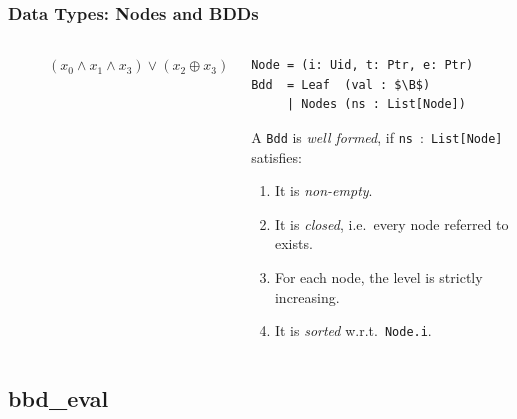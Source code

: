 \documentclass[english, aspectratio=169]{beamer}
\newcommand{\B}[0]{\ensuremath{\mathbb{B}}}
\begin{document}
\begin{frame} %
  \frametitle{Data Types: Nodes and BDDs}

  \begin{columns}
    \begin{column}[t]{0.4\linewidth}
      \begin{figure}
        \centering

        \begin{tikzpicture}[every node/.style={transform shape}]
          
        \end{tikzpicture}

        \caption{$(x_0 \wedge x_1 \wedge x_3) \vee (x_2 \oplus x_3)$}
      \end{figure}
    \end{column}
    \begin{column}[t]{0.6\linewidth}
      \begin{lstlisting}
Node = (i: Uid, t: Ptr, e: Ptr)
Bdd  = Leaf  (val : $\B$)
     | Nodes (ns : List[Node])
      \end{lstlisting}

      \begin{definition}
        A \texttt{Bdd} is \emph{well formed}, if \texttt{ns}~:~\texttt{List[Node]} satisfies:
        \begin{enumerate}
        \item It is \emph{non-empty}.
        \item It is \emph{closed}, i.e.\ every node referred to exists.
        \item For each node, the level is strictly increasing.
        \item It is \emph{sorted} w.r.t.\ \texttt{Node.i}.
        \end{enumerate}
      \end{definition}
    \end{column}
  \end{columns}
\end{frame}

\subsection{bbd\_eval}
\end{document}
